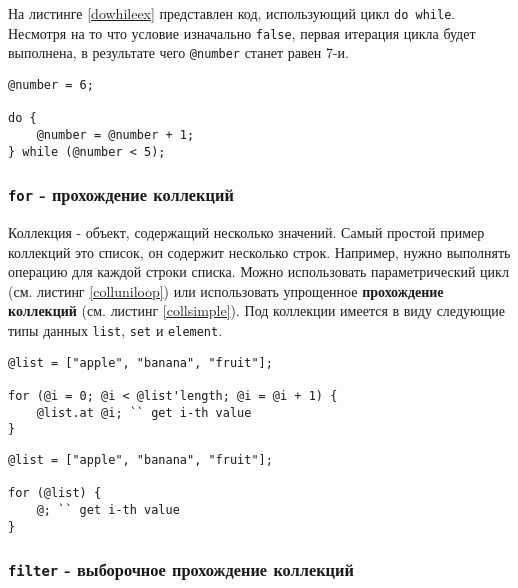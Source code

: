 На листинге \ref{dowhileex} представлен код, использующий цикл \texttt{do while}. Несмотря на то что условие изначально \texttt{false}, первая итерация цикла будет выполнена, в результате чего \texttt{@number} станет равен 7-и.

\begin{sourcecode}
\label{dowhileex}
\begin{verbatim}
@number = 6;

do {
	@number = @number + 1;
} while (@number < 5);
\end{verbatim}
\end{sourcecode}

\subsubsection{\texttt{for} - прохождение коллекций}

{Коллекция} - объект, содержащий несколько значений. Самый простой пример коллекций это список, он содержит несколько строк. Например, нужно выполнять операцию для каждой строки списка. Можно использовать параметрический цикл (см. листинг \ref{colluniloop}) или использовать упрощенное {\bf прохождение коллекций} (см. листинг \ref{collsimple}). Под коллекции имеется в виду следующие типы данных \texttt{list}, \texttt{set} и \texttt{element}.
\begin{sourcecode}
\label{colluniloop}
\begin{verbatim}
@list = ["apple", "banana", "fruit"];

for (@i = 0; @i < @list'length; @i = @i + 1) {
	@list.at @i; `` get i-th value
}
\end{verbatim}
\end{sourcecode}

\begin{sourcecode}
\label{collsimple}
\begin{verbatim}
@list = ["apple", "banana", "fruit"];

for (@list) {
	@; `` get i-th value
}
\end{verbatim}
\end{sourcecode}

\subsubsection{\texttt{filter} - выборочное прохождение коллекций}

